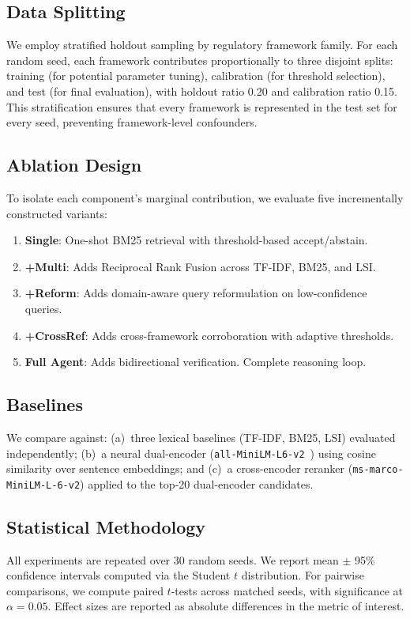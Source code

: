 \documentclass{sn-jnl}
\begin{document}
\subsection{Data Splitting}
We employ stratified holdout sampling by regulatory framework family.
For each random seed, each framework contributes proportionally to three disjoint splits: training (for potential parameter tuning), calibration (for threshold selection), and test (for final evaluation), with holdout ratio 0.20 and calibration ratio 0.15.
This stratification ensures that every framework is represented in the test set for every seed, preventing framework-level confounders.

\subsection{Ablation Design}
To isolate each component's marginal contribution, we evaluate five incrementally constructed variants:
\begin{enumerate}
    \item \textbf{Single}: One-shot BM25 retrieval with threshold-based accept/abstain.
    \item \textbf{+Multi}: Adds Reciprocal Rank Fusion across TF-IDF, BM25, and LSI.
    \item \textbf{+Reform}: Adds domain-aware query reformulation on low-confidence queries.
    \item \textbf{+CrossRef}: Adds cross-framework corroboration with adaptive thresholds.
    \item \textbf{Full Agent}: Adds bidirectional verification. Complete reasoning loop.
\end{enumerate}

\subsection{Baselines}
We compare against:
(a)~three lexical baselines (TF-IDF, BM25, LSI) evaluated independently;
(b)~a neural dual-encoder (\texttt{all-MiniLM-L6-v2}~\cite{Reimers2019}) using cosine similarity over sentence embeddings; and
(c)~a cross-encoder reranker (\texttt{ms-marco-MiniLM-L-6-v2}) applied to the top-20 dual-encoder candidates.

\subsection{Statistical Methodology}
All experiments are repeated over 30 random seeds.
We report mean $\pm$ 95\% confidence intervals computed via the Student $t$ distribution.
For pairwise comparisons, we compute paired $t$-tests across matched seeds, with significance at $\alpha = 0.05$.
Effect sizes are reported as absolute differences in the metric of interest.
\end{document}
